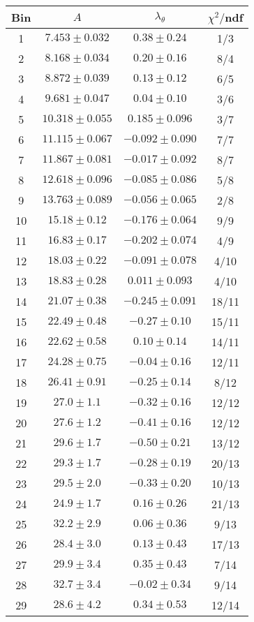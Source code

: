 \begin{tabular}{c|c|c|c}
Bin & $A$ & $\lambda_\theta$ & $\chi^2/$ndf \\
\hline
1 & $7.453\pm0.032$ & $0.38\pm0.24$ & 1/3 \\
2 & $8.168\pm0.034$ & $0.20\pm0.16$ & 8/4 \\
3 & $8.872\pm0.039$ & $0.13\pm0.12$ & 6/5 \\
4 & $9.681\pm0.047$ & $0.04\pm0.10$ & 3/6 \\
5 & $10.318\pm0.055$ & $0.185\pm0.096$ & 3/7 \\
6 & $11.115\pm0.067$ & $-0.092\pm0.090$ & 7/7 \\
7 & $11.867\pm0.081$ & $-0.017\pm0.092$ & 8/7 \\
8 & $12.618\pm0.096$ & $-0.085\pm0.086$ & 5/8 \\
9 & $13.763\pm0.089$ & $-0.056\pm0.065$ & 2/8 \\
10 & $15.18\pm0.12$ & $-0.176\pm0.064$ & 9/9 \\
11 & $16.83\pm0.17$ & $-0.202\pm0.074$ & 4/9 \\
12 & $18.03\pm0.22$ & $-0.091\pm0.078$ & 4/10 \\
13 & $18.83\pm0.28$ & $0.011\pm0.093$ & 4/10 \\
14 & $21.07\pm0.38$ & $-0.245\pm0.091$ & 18/11 \\
15 & $22.49\pm0.48$ & $-0.27\pm0.10$ & 15/11 \\
16 & $22.62\pm0.58$ & $0.10\pm0.14$ & 14/11 \\
17 & $24.28\pm0.75$ & $-0.04\pm0.16$ & 12/11 \\
18 & $26.41\pm0.91$ & $-0.25\pm0.14$ & 8/12 \\
19 & $27.0\pm1.1$ & $-0.32\pm0.16$ & 12/12 \\
20 & $27.6\pm1.2$ & $-0.41\pm0.16$ & 12/12 \\
21 & $29.6\pm1.7$ & $-0.50\pm0.21$ & 13/12 \\
22 & $29.3\pm1.7$ & $-0.28\pm0.19$ & 20/13 \\
23 & $29.5\pm2.0$ & $-0.33\pm0.20$ & 10/13 \\
24 & $24.9\pm1.7$ & $0.16\pm0.26$ & 21/13 \\
25 & $32.2\pm2.9$ & $0.06\pm0.36$ & 9/13 \\
26 & $28.4\pm3.0$ & $0.13\pm0.43$ & 17/13 \\
27 & $29.9\pm3.4$ & $0.35\pm0.43$ & 7/14 \\
28 & $32.7\pm3.4$ & $-0.02\pm0.34$ & 9/14 \\
29 & $28.6\pm4.2$ & $0.34\pm0.53$ & 12/14 \\
\end{tabular}
